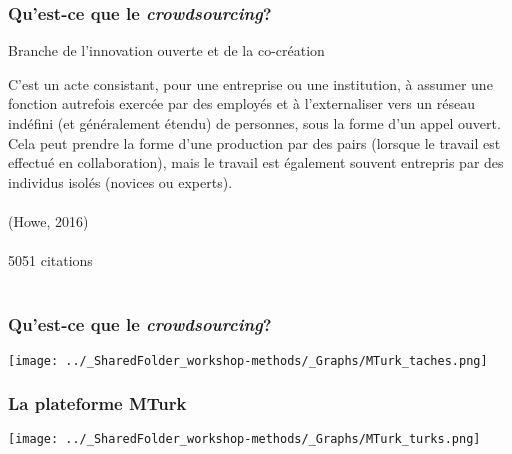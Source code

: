 \documentclass{beamer}
\begin{document}
    \begin{frame}
    
      \frametitle{Qu’est-ce que le \emph{crowdsourcing}?} \vspace{1cm}
      
    Branche de l’innovation ouverte et de la co-création
    
    \begin{center}
		C'est un acte consistant, pour une entreprise ou une institution, à assumer une fonction autrefois exercée par des employés et à l'externaliser vers un réseau indéfini (et généralement étendu) de personnes, sous la forme d'un appel ouvert. Cela peut prendre la forme d'une production par des pairs (lorsque le travail est effectué en collaboration), mais le travail est également souvent entrepris par des individus isolés (novices ou experts). \\~\\
		(Howe, 2016)  \\~\\
		5051 citations \\~\\
    \end{center}
         
    \end{frame}  
    
    

    \begin{frame}
    
      \frametitle{Qu’est-ce que le \emph{crowdsourcing}?} \vspace{1cm}
      
       \begin{center}
         \texttt{[image: ../\_SharedFolder\_workshop-methods/\_Graphs/MTurk\_taches.png]}
        \end{center} 
   
         
    \end{frame}  
    

    \begin{frame}
    
      \frametitle{La plateforme MTurk} \vspace{1cm}

       \begin{center}
         \texttt{[image: ../\_SharedFolder\_workshop-methods/\_Graphs/MTurk\_turks.png]}
        \end{center} 
   
         
    \end{frame}  
    
\end{document}
